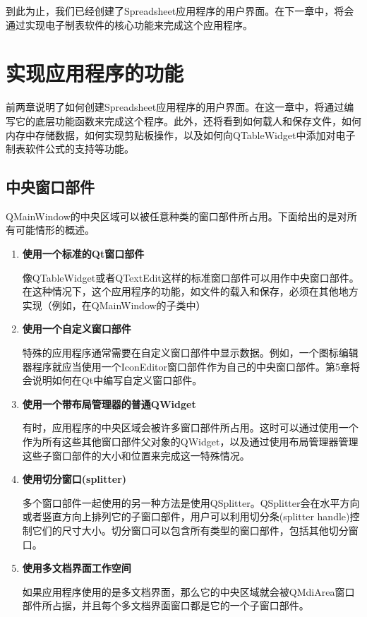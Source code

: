 \documentclass[11pt,oneside]{book}
\begin{document}
\begin{common-format}
到此为止，我们已经创建了Spreadsheet应用程序的用户界面。在下一章中，将会通过实现电子制表软件的核心功能来完成这个应用程序。


\chapter{实现应用程序的功能}
前两章说明了如何创建Spreadsheet应用程序的用户界面。在这一章中，将通过编写它的底层功能函数来完成这个程序。此外，还将看到如何载人和保存文件，如何内存中存储数据，如何实现剪贴板操作，以及如何向QTableWidget中添加对电子制表软件公式的支持等功能。

\section{中央窗口部件}
QMainWindow的中央区域可以被任意种类的窗口部件所占用。下面给出的是对所有可能情形的概述。
\begin{enumerate}
\item \textbf{使用一个标准的Qt窗口部件}

像QTableWidget或者QTextEdit这样的标准窗口部件可以用作中央窗口部件。在这种情况下，这个应用程序的功能，如文件的载入和保存，必须在其他地方实现（例如，在QMainWindow的子类中）

\item \textbf{使用一个自定义窗口部件}

特殊的应用程序通常需要在自定义窗口部件中显示数据。例如，一个图标编辑器程序就应当使用一个IconEditor窗口部件作为自己的中央窗口部件。第5章将会说明如何在Qt中编写自定义窗口部件。

\item \textbf{使用一个带布局管理器的普通QWidget}

有时，应用程序的中央区域会被许多窗口部件所占用。这时可以通过使用一个作为所有这些其他窗口部件父对象的QWidget，以及通过使用布局管理器管理这些子窗口部件的大小和位置来完成这一特殊情况。

\item \textbf{使用切分窗口(splitter)}

多个窗口部件一起使用的另一种方法是使用QSplitter。QSplitter会在水平方向或者竖直方向上排列它的子窗口部件，用户可以利用切分条(splitter handle)控制它们的尺寸大小。切分窗口可以包含所有类型的窗口部件，包括其他切分窗口。

\item \textbf{使用多文档界面工作空间}

如果应用程序使用的是多文档界面，那么它的中央区域就会被QMdiArea窗口部件所占据，并且每个多文档界面窗口都是它的一个子窗口部件。
\end{enumerate}


\end{common-format}
\end{document}
